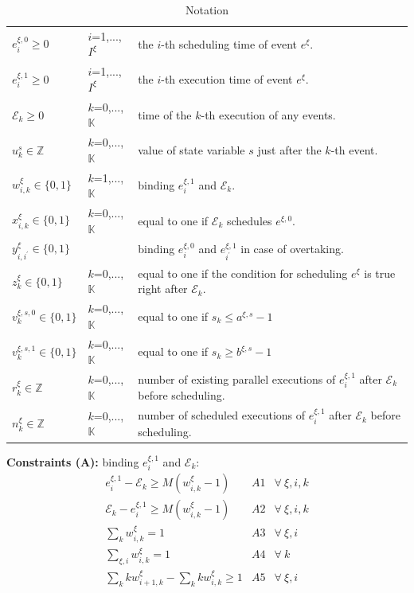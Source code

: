 \documentclass[]{interact}
\theoremstyle{plain}%
\theoremstyle{definition}
\theoremstyle{remark}
\begin{document}
\begin{table}[h]
	\begin{tabular}{lll}
		$e^{\xi,0}_{i}\ge 0$ & $i$=1,...,$I^{\xi}$& the $i$-th scheduling time of event $e^{\xi}$.\\
		$e^{\xi,1}_{i}\ge 0$ & $i$=1,...,$I^{\xi}$& the $i$-th execution time of event $e^{\xi}$.\\
		$\mathcal{E}_k\ge 0$ &$k$=0,...,$\mathbb{K}$& time of the $k$-th execution of any events.\\
		$u^s_k\in \mathbb{Z}$ &$k$=0,...,$\mathbb{K}$& value of state variable $s$ just after the $k$-th event.\\
		$w^{\xi}_{i,k}\in \{0,1\}$ &$k$=1,...,$\mathbb{K}$& binding $e^{\xi,1}_i$ and $\mathcal{E}_k$.\\
		$x^{\xi}_{i,k}\in\{0,1\}$ &$k$=0,...,$\mathbb{K}$& equal to one if $\mathcal{E}_k$ schedules $e^{\xi,0}$.\\
		$y^{\xi}_{i,i^{'}}\in\{0,1\}$&& binding $e^{\xi,0}_i$ and $e^{\xi,1}_{i^{'}}$ in case of overtaking.\\
		$z^{\xi}_{k}\in\{0,1\}$ &$k$=0,...,$\mathbb{K}$& equal to one if the condition for scheduling $e^{\xi}$ is true right after $\mathcal{E}_k$.\\ 
		$v^{\xi,s,0}_k\in\{0,1\}$ &$k$=0,...,$\mathbb{K}$& equal to one if $s_k\le a^{\xi,s}-1$\\
		$v^{\xi,s,1}_k\in\{0,1\}$ &$k$=0,...,$\mathbb{K}$& equal to one if $s_k\ge b^{\xi,s}-1$\\
		$r^{\xi}_k\in \mathbb{Z}$ &$k$=0,...,$\mathbb{K}$& number of existing parallel executions of $e^{\xi,1}_i$ after $\mathcal{E}_k$ before scheduling.\\
		$n^{\xi}_k\in \mathbb{Z}$ & $k$=0,...,$\mathbb{K}$ & number of scheduled executions of $e^{\xi,1}_i$ after $\mathcal{E}_k$ before scheduling.\\
	\end{tabular}
\caption{Notation}
\end{table}

\textbf{Constraints (A):} binding $e^{\xi,1}_i$ and $\mathcal{E}_k$:
\begin{eqnarray}
	e^{\xi,1}_i-\mathcal{E}_k\ge M(w^{\xi}_{i,k}-1) &A1& \forall\ \xi,i,k\\
	\mathcal{E}_k-e^{\xi,1}_i\ge M(w^{\xi}_{i,k}-1) &A2& \forall\ \xi,i,k\\
	\sum_{k} w^{\xi}_{i,k} =1&A3& \forall\ \xi,i\\
	\sum_{\xi,i} w^{\xi}_{i,k} =1&A4& \forall\ k\\
	\sum_{k} kw^{\xi}_{i+1,k} - \sum_{k} kw^{\xi}_{i,k} \ge 1&A5& \forall\ \xi,i
\end{eqnarray}
\end{document}
